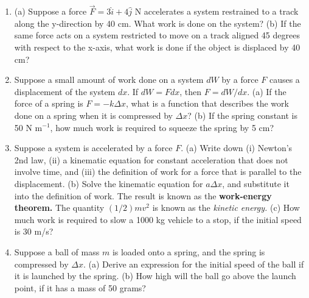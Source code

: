 \documentclass{article}
\begin{document}
\begin{enumerate}
\item (a) Suppose a force $\vec{F} = 3\hat{i} + 4\hat{j}$ N accelerates a system restrained to a track along the y-direction by 40 cm.  What work is done on the system?  (b) If the same force acts on a system restricted to move on a track aligned 45 degrees with respect to the x-axis, what work is done if the object is displaced by 40 cm? \\ \vspace{3cm}
\item Suppose a small amount of work done on a system $dW$ by a force $F$ causes a displacement of the system $dx$.  If $dW = F dx$, then $F = dW/dx$. (a) If the force of a spring is $F = -k\Delta x$, what is a function that describes the work done on a spring when it is compressed by $\Delta x$? (b) If the spring constant is 50 N m$^{-1}$, how much work is required to squeeze the spring by 5 cm? \\ \vspace{3cm}
\item Suppose a system is accelerated by a force $F$. (a) Write down (i) Newton's 2nd law, (ii) a kinematic equation for constant acceleration that does not involve time, and (iii) the definition of work for a force that is parallel to the displacement. (b) Solve the kinematic equation for $a\Delta x$, and substitute it into the definition of work.  The result is known as the \textbf{work-energy theorem.}  The quantity $(1/2)mv^2$ is known as the \textit{kinetic energy.}  (c) How much work is required to slow a 1000 kg vehicle to a stop, if the initial speed is 30 m/s? \\ \vspace{3cm}
\item Suppose a ball of mass $m$ is loaded onto a spring, and the spring is compressed by $\Delta x$. (a) Derive an expression for the initial speed of the ball if it is launched by the spring. (b) How high will the ball go above the launch point, if it has a mass of 50 grams? \\ \vspace{3cm}
\end{enumerate}
\end{document}

